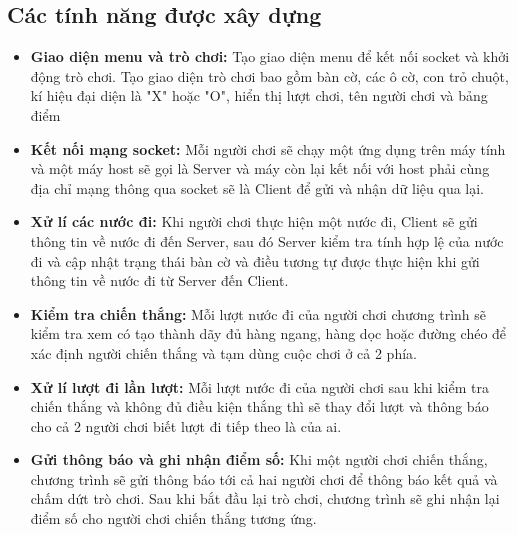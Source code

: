 \documentclass[a4paper]{article}
\begin{document}
\subsection{Các tính năng được xây dựng}
\begin{itemize}
    \item \textbf{Giao diện menu và trò chơi:} Tạo giao diện menu để kết nối socket và khởi động trò chơi. Tạo giao diện trò chơi bao gồm bàn cờ, các ô cờ, con trỏ chuột, kí hiệu đại diện là "X" hoặc "O", hiển thị lượt chơi, tên người chơi và bảng điểm 
    \item \textbf{Kết nối mạng socket:} Mỗi người chơi sẽ chạy một ứng dụng trên máy tính và một máy host sẽ gọi là Server và máy còn lại kết nối với host phải cùng địa chỉ mạng thông qua socket sẽ là Client để gửi và nhận dữ liệu qua lại.
    \item \textbf{Xử lí các nước đi:} Khi người chơi thực hiện một nước đi, Client sẽ gửi thông tin về nước đi đến Server, sau đó Server kiểm tra tính hợp lệ của nước đi và cập nhật trạng thái bàn cờ và điều tương tự được thực hiện khi gửi thông tin về nước đi từ Server đến Client.
    \item \textbf{Kiểm tra chiến thắng:} Mỗi lượt nước đi của người chơi chương trình sẽ kiểm tra xem có tạo thành dãy đủ hàng ngang, hàng dọc hoặc đường chéo để xác định người chiến thắng và tạm dùng cuộc chơi ở cả 2 phía.
    \item \textbf{Xử lí lượt đi lần lượt:} Mỗi lượt nước đi của người chơi sau khi kiểm tra chiến thắng và không đủ điều kiện thắng thì sẽ thay đổi lượt và thông báo cho cả 2 người chơi biết lượt đi tiếp theo là của ai.
    \item \textbf{Gửi thông báo và ghi nhận điểm số:} Khi một người chơi chiến thắng, chương trình sẽ gửi thông báo tới cả hai người chơi để thông báo kết quả và chấm dứt trò chơi. Sau khi bắt đầu lại trò chơi, chương trình sẽ ghi nhận lại điểm số cho người chơi chiến thắng tương ứng.
\end{itemize}
\end{document}
